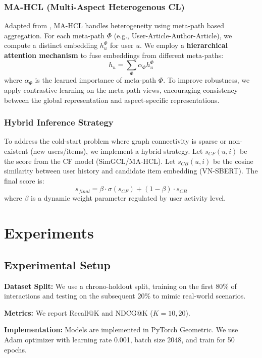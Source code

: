 \documentclass[11pt]{article}
\begin{document}
\subsubsection{MA-HCL (Multi-Aspect Heterogenous CL)}
Adapted from \citet{liu2021heterogeneous}, MA-HCL handles heterogeneity using meta-path based aggregation. For each meta-path $\Phi$ (e.g., User-Article-Author-Article), we compute a distinct embedding $h_u^{\Phi}$ for user $u$.
We employ a \textbf{hierarchical attention mechanism} to fuse embeddings from different meta-paths:
\begin{equation}
    h_u = \sum_{\Phi} \alpha_{\Phi} h_u^{\Phi}
\end{equation}
where $\alpha_{\Phi}$ is the learned importance of meta-path $\Phi$. To improve robustness, we apply contrastive learning on the meta-path views, encouraging consistency between the global representation and aspect-specific representations.

\subsubsection{Hybrid Inference Strategy}
To address the cold-start problem where graph connectivity is sparse or non-existent (new users/items), we implement a hybrid strategy.
Let $s_{CF}(u, i)$ be the score from the CF model (SimGCL/MA-HCL).
Let $s_{CB}(u, i)$ be the cosine similarity between user history and candidate item embedding (VN-SBERT).
The final score is:
\begin{equation}
    s_{final} = \beta \cdot \sigma(s_{CF}) + (1-\beta) \cdot s_{CB}
\end{equation}
where $\beta$ is a dynamic weight parameter regulated by user activity level.

\section{Experiments}

\subsection{Experimental Setup}
\textbf{Dataset Split:} We use a chrono-holdout split, training on the first 80\% of interactions and testing on the subsequent 20\% to mimic real-world scenarios.

\textbf{Metrics:} We report Recall@K and NDCG@K ($K=10, 20$).

\textbf{Implementation:} Models are implemented in PyTorch Geometric. We use Adam optimizer with learning rate 0.001, batch size 2048, and train for 50 epochs.
\end{document}
